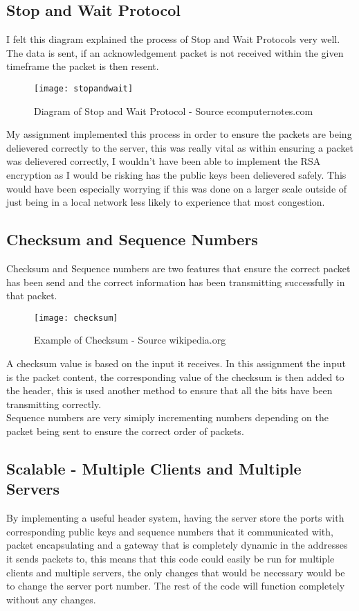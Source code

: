 \documentclass[10pt]{article}
\begin{document}
\subsection{Stop and Wait Protocol}
I felt this diagram explained the process of Stop and Wait Protocols very well. The data is sent, if an acknowledgement packet is not received within the given timeframe the packet is then resent.
\begin{description}
	\item
	\begin{figure}[h!]
		\texttt{[image: stopandwait]}
		\caption{Diagram of Stop and Wait Protocol - Source ecomputernotes.com}
		\label{fig:packetEncapsulation}
	\end{figure}
\end{description}
My assignment implemented this process in order to ensure the packets are being delievered correctly to the server, this was really vital as within ensuring a packet was delievered correctly, I wouldn't have been able to implement the RSA encryption as I would be risking has the public keys been delievered safely. This would have been especially worrying if this was done on a larger scale outside of just being in a local network less likely to experience that most congestion.\newpage
\subsection{Checksum and Sequence Numbers}
Checksum and Sequence numbers are two features that ensure the correct packet has been send and the correct information has been transmitting successfully in that packet.
\begin{description}
	\item
	\begin{figure}[h!]
		\texttt{[image: checksum]}
		\caption{Example of Checksum - Source wikipedia.org}
		\label{fig:checksum}
	\end{figure}
\end{description}
A checksum value is based on the input it receives. In this assignment the input is the packet content, the corresponding value of the checksum is then added to the header, this is used another method to ensure that all the bits have been transmitting correctly.\\
Sequence numbers are very simiply incrementing numbers depending on the packet being sent to ensure the correct order of packets.
\subsection{Scalable - Multiple Clients and Multiple Servers}
By implementing a useful header system, having the server store the ports with corresponding public keys and sequence numbers that it communicated with, packet encapsulating and a gateway that is completely dynamic in the addresses it sends packets to, this means that this code could easily be run for multiple clients and multiple servers, the only changes that would be necessary would be to change the server port number. The rest of the code will function completely without any changes.\newpage
\end{document}
